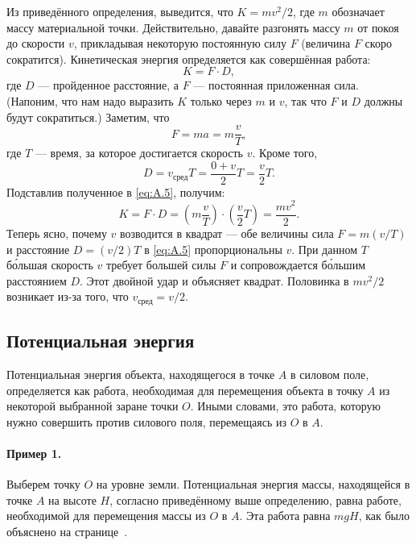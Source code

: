 Из приведённого определения, выведится, что $K = m v^2/2$, где $m$ обозначает массу материальной точки.
Действительно, давайте разгонять массу $m$ от покоя до скорости $v$, прикладывая некоторую постоянную силу $F$ (величина $F$ скоро сократится).
Кинетическая энергия определяется как совершённая работа:
\begin{equation}
    K = F \cdot D,
    \label{eq:A.5}
\end{equation}
где $D$ --- пройденное расстояние, а $F$ --- постоянная приложенная сила.
(Напоним, что нам надо выразить $K$ только через $m$ и $v$,
так что $F$ и $D$ должны будут сократиться.)
Заметим, что
\[F = ma = m \frac{v}{T},\]
где $T$ --- время, за которое достигается скорость $v$.
Кроме того,
\[D = v_{\text{сред}} T = \frac{0 + v}{2}  T = \frac{v}{2} T.\]
Подставлив полученное в \eqref{eq:A.5}, получим:
\[K = F \cdot D= \left(m \frac{v}{T}\right) \cdot\left(\frac{v}{2} T\right)= \frac{m v^2}{2} .\]
Теперь ясно, почему $v$ возводится в квадрат --- обе величины сила $F = m(v/T)$ и расстояние $D = (v/2)T$ в \eqref{eq:A.5} пропорциональны $v$.
При данном $T$ б\'{о}льшая скорость $v$ требует большей силы $F$ и сопровождается б\'{о}льшим расстоянием $D$.
Этот двойной удар и объясняет квадрат.
Половинка в $mv^2/2$ возникает из-за того, что $v_{\text{сред}} = v/2$.

\subsection{Потенциальная энергия}

Потенциальная энергия объекта, находящегося в точке $A$ в силовом поле, определяется как работа, необходимая для перемещения объекта в точку $A$ из некоторой выбранной заране точки $O$.
Иными словами, это работа, которую нужно совершить против силового поля, перемещаясь из $O$ в $A$.

\paragraph{Пример 1.}
Выберем точку $O$ на уровне земли.
Потенциальная энергия массы, находящейся в точке $A$ на высоте $H$,
согласно приведённому выше определению, равна работе,
необходимой для перемещения массы из $O$ в $A$.
Эта работа равна $mgH$, как было объяснено на странице~\pageref{Работа:Пример}.

